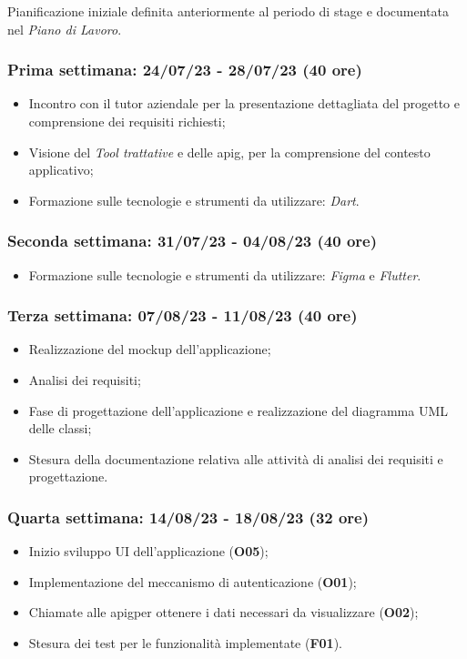 Pianificazione iniziale definita anteriormente al periodo di stage e documentata nel \emph{Piano di Lavoro}.

\subsubsection{Prima settimana: 24/07/23 - 28/07/23 (40 ore)}
    \begin{itemize}
        \item Incontro con il tutor aziendale per la presentazione dettagliata del progetto e comprensione dei requisiti richiesti;
        \item Visione del \emph{Tool trattative} e delle \gls{apig}\glsoccur, per la comprensione del contesto applicativo;
        \item Formazione sulle tecnologie e strumenti da utilizzare: \emph{Dart}\cite{site:dart}.
    \end{itemize}
\subsubsection{Seconda settimana: 31/07/23 - 04/08/23 (40 ore)}
    \begin{itemize}
        \item Formazione sulle tecnologie e strumenti da utilizzare: \emph{Figma}\cite{site:figma} e \emph{Flutter}\cite{site:flutter}.
    \end{itemize}
\subsubsection{Terza settimana: 07/08/23 - 11/08/23 (40 ore)}
    \begin{itemize}
        \item Realizzazione del \gls{mockup} dell'applicazione;
        \item Analisi dei requisiti;
        \item Fase di progettazione dell'applicazione e realizzazione del diagramma UML delle classi;
        \item Stesura della documentazione relativa alle attività di analisi dei requisiti e progettazione.
    \end{itemize}
\subsubsection{Quarta settimana: 14/08/23 - 18/08/23 (32 ore)}
    \begin{itemize}
        \item Inizio sviluppo UI dell'applicazione (\textbf{O05});
        \item Implementazione del meccanismo di autenticazione (\textbf{O01});
        \item Chiamate alle \gls{apig}\glsoccur per ottenere i dati necessari da visualizzare (\textbf{O02});
        \item Stesura dei test per le funzionalità implementate (\textbf{F01}).
    \end{itemize}
